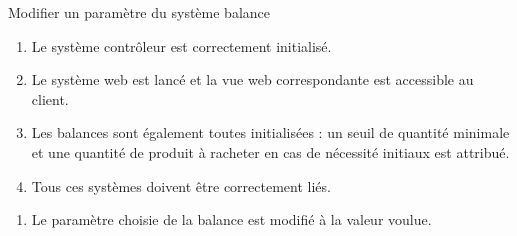 ﻿\begin{UseCase}{Modifier un paramètre du système balance}



\begin{UseCasePre}
    \begin{enumerate}
        \item Le système contrôleur est correctement initialisé.
        \item Le système web est lancé et la vue web correspondante est
            accessible au client.
        \item Les balances sont également toutes initialisées : un seuil de
            quantité minimale et une quantité de produit à racheter en cas de
            nécessité initiaux est attribué.
        \item Tous ces systèmes doivent être correctement liés.
    \end{enumerate}
\end{UseCasePre}

\begin{UseCasePost}
    \begin{enumerate}
        \item Le paramètre choisie de la balance est modifié à la valeur
            voulue.
    \end{enumerate}
\end{UseCasePost}


\end{UseCase}
